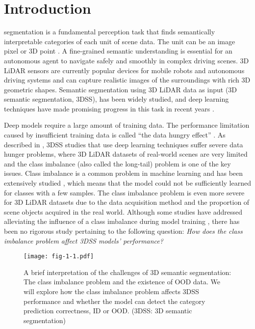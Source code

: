 \documentclass[journal]{IEEEtran}
\begin{document}
\section{Introduction}

 segmentation \cite{yu2018methods}\cite{lateef2019survey} is a fundamental perception task that finds semantically interpretable categories of each unit of scene data. The unit can be an image pixel \cite{yu2018methods} or 3D point \cite{yuxing2019review}. A fine-grained semantic understanding is essential for an autonomous agent to navigate safely and smoothly in complex driving scenes. 3D LiDAR sensors are currently popular devices for mobile robots \cite{patz2008practical} and autonomous driving systems \cite{li2016vehicle}\cite{chen2017multi} and can capture realistic images of the surroundings with rich 3D geometric shapes. Semantic segmentation using 3D LiDAR data as input (3D semantic segmentation, 3DSS), has been widely studied, and deep learning techniques have made promising progress in this task in recent years \cite{yuxing2019review}\cite{yulan2019review}.

Deep models require a large amount of training data. The performance limitation caused by insufficient training data is called ``the data hungry effect'' \cite{marcus2018deep}. As described in \cite{gao2021we}, 3DSS studies that use deep learning techniques suffer severe data hunger problems, where 3D LiDAR datasets of real-world scenes are very limited and the class imbalance (also called the long-tail) problem is one of the key issues. Class imbalance is a common problem in machine learning and has been extensively studied \cite{buda2018systematic}, which means that the model could not be sufficiently learned for classes with a few samples. The class imbalance problem is even more severe for 3D LiDAR datasets due to the data acquisition method and the proportion of scene objects acquired in the real world. Although some studies have addressed alleviating the influence of a class imbalance during model training \cite{haixiang2017learning}, there has been no rigorous study pertaining to the following question: \textit{How does the class imbalance problem affect 3DSS models' performance?} 

\begin{figure}[t]
	\centering
	\texttt{[image: fig-1-1.pdf]}
	\vspace{-3mm}
	\caption{A brief interpretation of  the challenges of 3D semantic segmentation: The class imbalance problem and the existence of OOD data. We will explore how the class imbalance problem affects 3DSS performance and whether the model can detect the category prediction correctness, ID or OOD. (3DSS: 3D semantic segmentation)}
	\label{fig:logic}
	\vspace{-4mm}
\end{figure}
\end{document}
